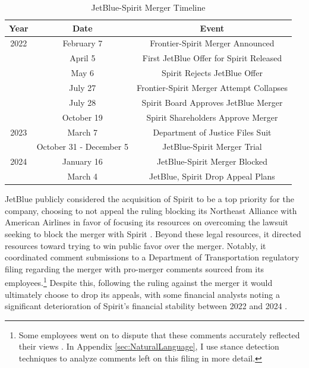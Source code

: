 \documentclass{article}
\begin{document}
    	\begin{table}[tb]
		\caption{JetBlue-Spirit Merger Timeline}
		\label{tab:JetBlue_Spirit_Timeline}
		\begin{center}
			\begin{tabular}{ccc}
				\hline
				Year & Date & Event \\
				\hline
				2022 & February 7 & Frontier-Spirit Merger Announced \\
				& April 5 &  First JetBlue Offer for Spirit Released\\
				& May 6 & Spirit Rejects JetBlue Offer \\
				& July 27 &  Frontier-Spirit Merger Attempt Collapses\\
				& July 28 &  Spirit Board Approves JetBlue Merger\\
				& October 19 & Spirit Shareholders Approve Merger \\
				\hline
				2023 & March 7 &  Department of Justice Files Suit\\
				& October 31 - December 5 &  JetBlue-Spirit Merger Trial \\
				\hline
				2024 & January 16 & JetBlue-Spirit Merger Blocked \\
				& March 4 & JetBlue, Spirit Drop Appeal Plans \\
			\end{tabular}
		\end{center}
	\end{table}

	JetBlue publicly considered the acquisition of Spirit to be a top priority for the company, choosing to not appeal the ruling blocking its Northeast Alliance with American Airlines in favor of focusing its resources on overcoming the lawsuit seeking to block the merger with Spirit \citep{aratani_jetblue_2023}. Beyond these legal resources, it directed resources toward trying to win public favor over the merger. Notably, it coordinated comment submissions to a Department of Transportation regulatory filing regarding the merger with pro-merger comments sourced from its employees.\footnote{Some employees went on to dispute that these comments accurately reflected their views \citep{birnbaum_elizabeth_2023, birnbaum_jet-blue_2023}. In Appendix \ref{sec:NaturalLanguage}, I use stance detection techniques to analyze comments left on this filing in more detail.} Despite this, following the ruling against the merger it would ultimately choose to drop its appeals, with some financial analysts noting a significant deterioration of Spirit's financial stability between 2022 and 2024 \citep{sider_jetblue_2024}. 
	
\end{document}
